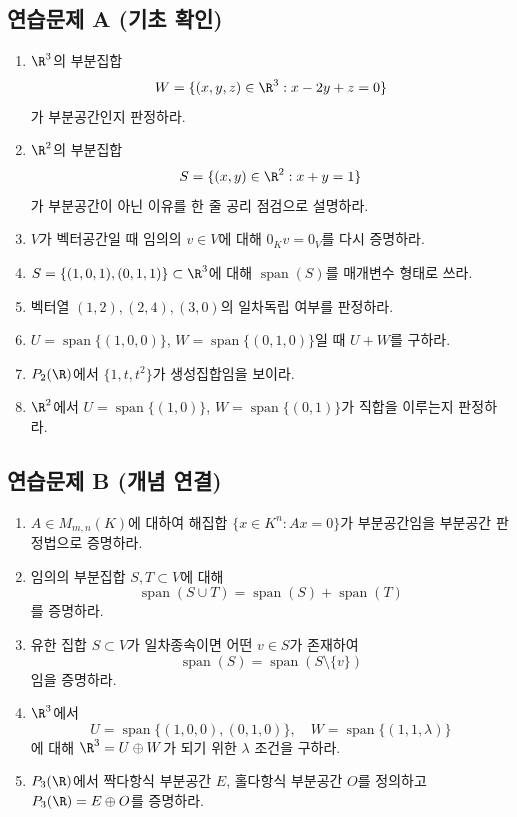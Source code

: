 
\chaptersummarytemplate

\chapterexercisestemplate

\subsection*{연습문제 A (기초 확인)}
\begin{enumerate}[label=A\arabic*.]
\item $\R^3$의 부분집합
\[
W=\{(x,y,z)\in\R^3:x-2y+z=0\}
\]
가 부분공간인지 판정하라.
\item $\R^2$의 부분집합
\[
S=\{(x,y)\in\R^2:x+y=1\}
\]
가 부분공간이 아닌 이유를 한 줄 공리 점검으로 설명하라.
\item $V$가 벡터공간일 때 임의의 $v\in V$에 대해 $0_Kv=0_V$를 다시 증명하라.
\item $S=\{(1,0,1),(0,1,1)\}\subset\R^3$에 대해 $\operatorname{span}(S)$를 매개변수 형태로 쓰라.
\item 벡터열 $(1,2),(2,4),(3,0)$의 일차독립 여부를 판정하라.
\item $U=\operatorname{span}\{(1,0,0)\}$, $W=\operatorname{span}\{(0,1,0)\}$일 때 $U+W$를 구하라.
\item $P_2(\R)$에서 $\{1,t,t^2\}$가 생성집합임을 보이라.
\item $\R^2$에서 $U=\operatorname{span}\{(1,0)\}$, $W=\operatorname{span}\{(0,1)\}$가 직합을 이루는지 판정하라.
\end{enumerate}

\subsection*{연습문제 B (개념 연결)}
\begin{enumerate}[label=B\arabic*.]
\item $A\in M_{m,n}(K)$에 대하여 해집합 $\{x\in K^n:Ax=0\}$가 부분공간임을 부분공간 판정법으로 증명하라.
\item 임의의 부분집합 $S,T\subset V$에 대해
\[
\operatorname{span}(S\cup T)=\operatorname{span}(S)+\operatorname{span}(T)
\]
를 증명하라.
\item 유한 집합 $S\subset V$가 일차종속이면 어떤 $v\in S$가 존재하여
\[
\operatorname{span}(S)=\operatorname{span}(S\setminus\{v\})
\]
임을 증명하라.
\item $\R^3$에서
\[
U=\operatorname{span}\{(1,0,0),(0,1,0)\},\quad
W=\operatorname{span}\{(1,1,\lambda)\}
\]
에 대해 $\R^3=U\oplus W$가 되기 위한 $\lambda$ 조건을 구하라.
\item $P_3(\R)$에서 짝다항식 부분공간 $E$, 홀다항식 부분공간 $O$를 정의하고 $P_3(\R)=E\oplus O$를 증명하라.
\end{enumerate}

